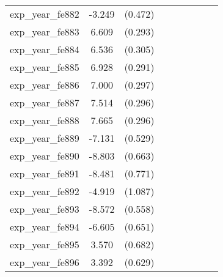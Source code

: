 {\begin{tabular}{l*{4}{cc}}
exp\_year\_fe882&   -3.249\sym{***}&  (0.472)&                  &         &                  &         &                  &         \\
exp\_year\_fe883&    6.609\sym{***}&  (0.293)&                  &         &                  &         &                  &         \\
exp\_year\_fe884&    6.536\sym{***}&  (0.305)&                  &         &                  &         &                  &         \\
exp\_year\_fe885&    6.928\sym{***}&  (0.291)&                  &         &                  &         &                  &         \\
exp\_year\_fe886&    7.000\sym{***}&  (0.297)&                  &         &                  &         &                  &         \\
exp\_year\_fe887&    7.514\sym{***}&  (0.296)&                  &         &                  &         &                  &         \\
exp\_year\_fe888&    7.665\sym{***}&  (0.296)&                  &         &                  &         &                  &         \\
exp\_year\_fe889&   -7.131\sym{***}&  (0.529)&                  &         &                  &         &                  &         \\
exp\_year\_fe890&   -8.803\sym{***}&  (0.663)&                  &         &                  &         &                  &         \\
exp\_year\_fe891&   -8.481\sym{***}&  (0.771)&                  &         &                  &         &                  &         \\
exp\_year\_fe892&   -4.919\sym{***}&  (1.087)&                  &         &                  &         &                  &         \\
exp\_year\_fe893&   -8.572\sym{***}&  (0.558)&                  &         &                  &         &                  &         \\
exp\_year\_fe894&   -6.605\sym{***}&  (0.651)&                  &         &                  &         &                  &         \\
exp\_year\_fe895&    3.570\sym{***}&  (0.682)&                  &         &                  &         &                  &         \\
exp\_year\_fe896&    3.392\sym{***}&  (0.629)&                  &         &                  &         &                  &         \\

\end{tabular}}
